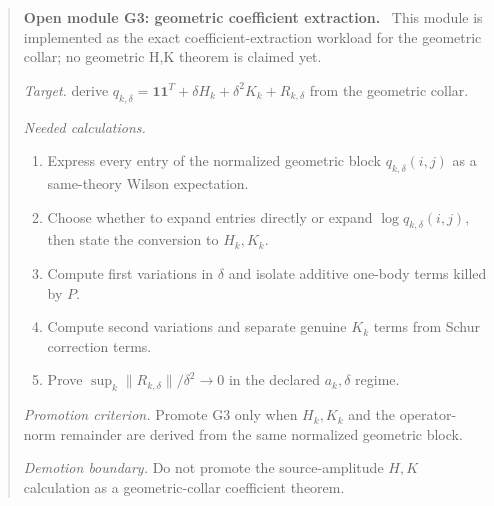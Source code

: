 \documentclass[11pt]{article}
\newcommand{\one}{\mathbf 1}
\newenvironment{openmodule}[1]
{\begin{quote}\color{red!55!black}\textbf{Open module #1.}\ }
{\end{quote}}
\begin{document}
\begin{openmodule}{G3: geometric coefficient extraction}
This module is implemented as the exact coefficient-extraction workload for the geometric collar; no geometric H,K theorem is claimed yet.

\emph{Target.} derive \(q_{k,\delta}=\one\one^T+\delta H_k+\delta^2K_k+R_{k,\delta}\) from the geometric collar.

\emph{Needed calculations.}
\begin{enumerate}[label=(\alph*)]
  \item Express every entry of the normalized geometric block \(q_{k,\delta}(i,j)\) as a same-theory Wilson expectation.
  \item Choose whether to expand entries directly or expand \(\log q_{k,\delta}(i,j)\), then state the conversion to \(H_k,K_k\).
  \item Compute first variations in \(\delta\) and isolate additive one-body terms killed by \(P\).
  \item Compute second variations and separate genuine \(K_k\) terms from Schur correction terms.
  \item Prove \(\sup_k\|R_{k,\delta}\|/\delta^2\to0\) in the declared \(a_k,\delta\) regime.
\end{enumerate}

\emph{Promotion criterion.} Promote G3 only when \(H_k,K_k\) and the operator-norm remainder are derived from the same normalized geometric block.

\emph{Demotion boundary.} Do not promote the source-amplitude \(H,K\) calculation as a geometric-collar coefficient theorem.
\end{openmodule}
\end{document}
